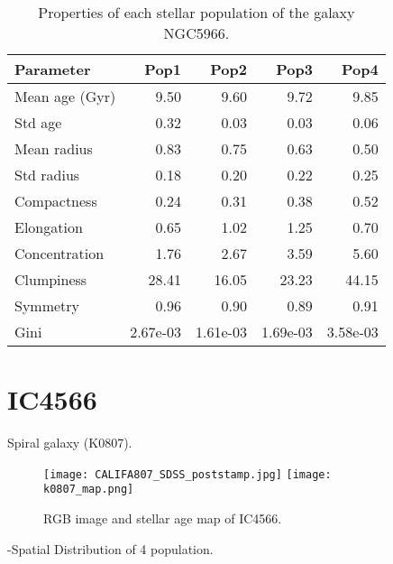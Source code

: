\begin{table}[h]
\centering
\begin{tabular}{l|r|r|r|r}
Parameter & Pop1 & Pop2 & Pop3 & Pop4 \\\hline
Mean age (Gyr) &9.50 & 9.60 & 9.72 & 9.85 \\
Std age & 0.32 & 0.03 & 0.03 & 0.06 \\
Mean radius & 0.83 & 0.75 & 0.63 & 0.50 \\
Std radius & 0.18 & 0.20 & 0.22 & 0.25 \\
Compactness & 0.24 & 0.31 & 0.38 & 0.52 \\
Elongation & 0.65 & 1.02 & 1.25 & 0.70 \\
Concentration & 1.76 & 2.67 & 3.59 & 5.60 \\
Clumpiness & 28.41 & 16.05 & 23.23 & 44.15 \\
Symmetry & 0.96 & 0.90 & 0.89 & 0.91 \\
Gini & 2.67e-03 & 1.61e-03 & 1.69e-03 & 3.58e-03 \\
\end{tabular}
\caption{\label{tab:widgets}Properties of each stellar population of the galaxy NGC5966.}
\end{table}

\newpage
\section*{IC4566}
Spiral galaxy (K0807).

\begin{figure}[bh]
\begin{center}
\texttt{[image: CALIFA807\_SDSS\_poststamp.jpg]}
\texttt{[image: k0807\_map.png]}
\caption{RGB image and stellar age map of IC4566.}
   \label{fig1}
\end{center}
\end{figure}

-Spatial Distribution of 4 population.

